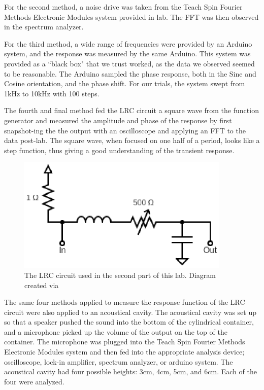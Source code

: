 \documentclass[12pt]{article}
\begin{document}
For the second method, a noise drive was taken from the Teach Spin Fourier Methods Electronic Modules system provided in lab. The FFT was then observed in the spectrum analyzer. 
    
For the third method, a wide range of frequencies were provided by an Arduino system, and the response was measured by the same Arduino. This system was provided as a ``black box" that we trust worked, as the data we observed seemed to be reasonable. The Arduino sampled the phase response, both in the Sine and Cosine orientation, and the phase shift. For our trials, the system swept from 1kHz to 10kHz with 100 steps. 
    
The fourth and final method fed the LRC circuit a square wave from the function generator and measured the amplitude and phase of the response by first snapshot-ing the the output with an oscilloscope and applying an FFT to the data post-lab. The square wave, when focused on one half of a period, looks like a step function, thus giving a good understanding of the transient response. 
    
\begin{figure}[!ht]
\centering
	\includegraphics[width=4in]{circuit}
	\caption{The LRC circuit used in the second part of this lab. Diagram created via \cite{circuit}}
	\label{fig:circuit}
\end{figure}
   
The same four methods applied to measure the response function of the LRC circuit were also applied to an acoustical cavity. The acoustical cavity was set up so that a speaker pushed the sound into the bottom of the cylindrical container, and a microphone picked up the volume of the output on the top of the container. The microphone was plugged into the Teach Spin Fourier Methods Electronic Modules system and then fed into the appropriate analysis device; oscilloscope, lock-in amplifier, spectrum analyzer, or arduino system. The acoustical cavity had four possible heights: 3cm, 4cm, 5cm, and 6cm. Each of the four were analyzed. 
    
\end{document}
